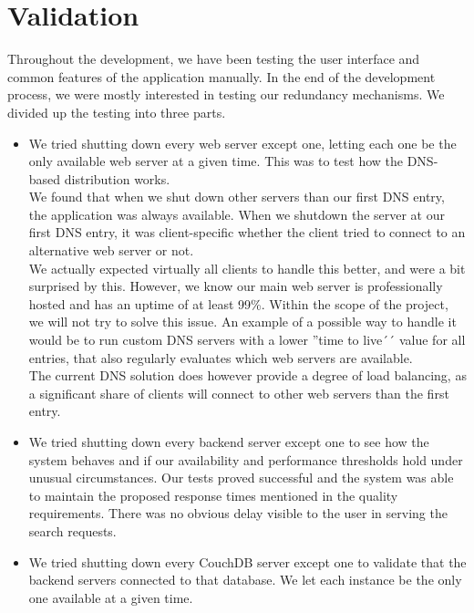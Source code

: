 \label{toolsanddeps}
\chapter{Validation}
Throughout the development, we have been testing the user interface and common
features of the application manually. In the end of the development process, we
were mostly interested in testing our redundancy mechanisms. We divided up the
testing into three parts.
\begin{itemize}
  \item We tried shutting down every web server except one, letting each one be
        the only available web server at a given time. This was to test how the
        DNS-based distribution works. \\

        We found that when we shut down other servers than our first DNS entry,
        the application was always available. When we shutdown the server at our
        first DNS entry, it was client-specific whether the client tried to
        connect to an alternative web server or not. \\

        We actually expected virtually all clients to handle this better, and
        were a bit surprised by this. However, we know our main web server is
        professionally hosted and has an uptime of at least 99\%. Within the
        scope of the project, we will not try to solve this issue. An example of
        a possible way to handle it would be to run custom DNS servers with a
        lower ''time to live´´ value for all entries, that also regularly
        evaluates which web servers are available. \\

        The current DNS solution does however provide a degree of load
        balancing, as a significant share of clients will connect to other web
        servers than the first entry.
  \item We tried shutting down every backend server except one to see how the
        system behaves and if our availability and performance thresholds hold
        under unusual circumstances. Our tests proved successful and the system
        was able to maintain the proposed response times mentioned in the
        quality requirements. There was no obvious delay visible to the user in
        serving the search requests. \newpage
  \item We tried shutting down every CouchDB server except one to validate that
        the backend servers connected to that database. We let each instance be
        the only one available at a given time. \\


\end{itemize}
